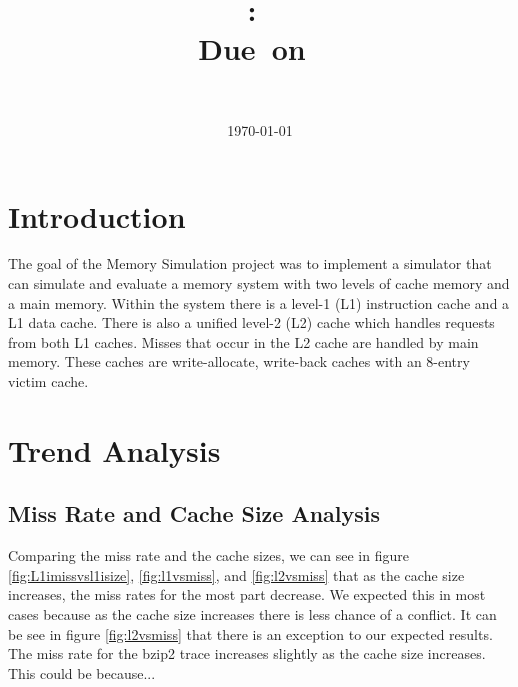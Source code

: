 \documentclass{article}
\title{
\vspace{2in}
\textmd{\textbf{\hmwkClass:\ \hmwkTitle}}\\
\normalsize\vspace{0.1in}\small{Due\ on\ \hmwkDueDate}\\
\vspace{3in}
}
\author{
\textbf{\hmwkAuthorName} \\
\hmwkAuthorNumber
}
\date{\today} %
\begin{document}
\maketitle



\newpage
\tableofcontents
\newpage
\lstlistoflistings
\newpage


\section{Introduction}

The goal of the Memory Simulation project was to implement a simulator that can simulate and evaluate a memory system with two levels of cache memory and a main memory. Within the system there is a level-1 (L1) instruction cache and a L1 data cache. There is also a unified level-2 (L2) cache which handles requests from both L1 caches. Misses that occur in the L2 cache are handled by main memory. These caches are write-allocate, write-back caches with an 8-entry victim cache. 

\section{Trend Analysis}

\subsection{Miss Rate and Cache Size Analysis}

Comparing the miss rate and the cache sizes, we can see in figure \ref{fig:L1imissvsl1isize}, \ref{fig:l1vsmiss}, and \ref{fig:l2vsmiss} that as the cache size increases, the miss rates for the most part decrease. We expected this in most cases because as the cache size increases there is less chance of a conflict. It can be see in figure \ref{fig:l2vsmiss} that there is an exception to our expected results. The miss rate for the bzip2 trace increases slightly as the cache size increases. This could be because...
\end{document}
